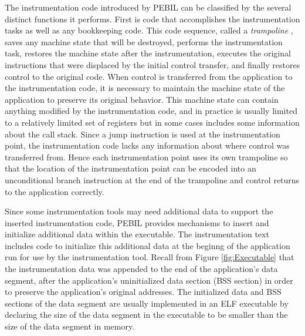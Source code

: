 The instrumentation code introduced by PEBIL can be classified by the several
distinct functions it performs. First is code that accomplishes the
instrumentation tasks as well as any bookkeeping code. This code sequence,
called a \textit{trampoline} \cite{buck2000api}, saves any machine state that
will be destroyed, performs the instrumentation task, restores the machine state
after the instrumentation, executes the original instructions that were
displaced by the initial control transfer, and finally restores control to the
original code. When control is transferred from the application to the
instrumentation code, it is necessary to maintain the machine state of the
application to preserve its original behavior. This machine state can contain
anything modified by the instrumentation code, and in practice is usually
limited to a relatively limited set of registers but in some cases includes some
information about the call stack. Since a jump instruction is used at the
instrumentation point, the instrumentation code lacks any information about
where control was transferred from. Hence each instrumentation point uses its
own trampoline so that the location of the instrumentation point can be encoded
into an unconditional branch instruction at the end of the trampoline and
control returns to the application correctly.

Since some instrumentation tools may need additional data to support the
inserted instrumentation code, PEBIL provides mechanisms to insert and
initialize additional data within the executable. The instrumentation text
includes code to initialize this additional data at the beginng of the
application run for use by the instrumentation tool. Recall from Figure
\ref{fig:Executable} that the instrumentation data was appended to the end of
the application's data segment, after the application's uninitialized data
section (BSS section) in order to preserve the application's original addresses.
The initialized data and BSS sections of the data segment are usually
implemented in an ELF executable by declaring the size of the data segment in
the executable to be smaller than the size of the data segment in memory. 

